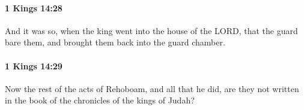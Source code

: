 		\paragraph{1 Kings 14:28} %
			\label{1KINGS-14-28}

			And it was so, when the king went into the house of the LORD, that the guard bare them, and brought them back into the guard chamber.


		\paragraph{1 Kings 14:29} %
			\label{1KINGS-14-29}

			Now the rest of the acts of Rehoboam, and all that he did, are they not written in the book of the chronicles of the kings of Judah?


